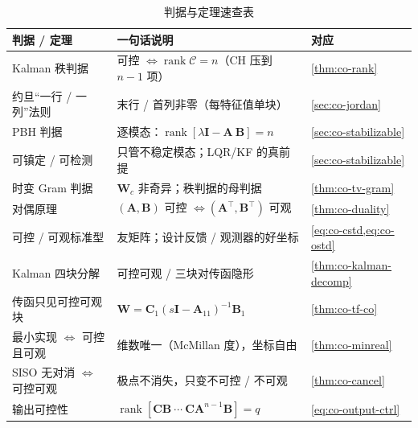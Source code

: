 \begin{table}[H]\centering\small
\caption{判据与定理速查表}
\begin{tabular}{lll}
\toprule
判据 / 定理 & 一句话说明 & 对应 \\
\midrule
Kalman 秩判据 & 可控 $\iff\operatorname{rank}\mathcal{C}=n$（CH 压到 $n-1$ 项） & \cref{thm:co-rank} \\
约旦“一行 / 一列”法则 & 末行 / 首列非零（每特征值单块） & \cref{sec:co-jordan} \\
PBH 判据 & 逐模态：$\operatorname{rank}[\lambda\mathbf{I}-\mathbf{A}\ \mathbf{B}]=n$ & \cref{sec:co-stabilizable} \\
可镇定 / 可检测 & 只管不稳定模态；LQR/KF 的真前提 & \cref{sec:co-stabilizable} \\
时变 Gram 判据 & $\mathbf{W}_c$ 非奇异；秩判据的母判据 & \cref{thm:co-tv-gram} \\
对偶原理 & $(\mathbf{A},\mathbf{B})$ 可控 $\iff(\mathbf{A}^\top,\mathbf{B}^\top)$ 可观 & \cref{thm:co-duality} \\
可控 / 可观标准型 & 友矩阵；设计反馈 / 观测器的好坐标 & \cref{eq:co-cstd,eq:co-ostd} \\
Kalman 四块分解 & 可控可观 / 三块对传函隐形 & \cref{thm:co-kalman-decomp} \\
传函只见可控可观块 & $\mathbf{W}=\mathbf{C}_1(s\mathbf{I}-\mathbf{A}_{11})^{-1}\mathbf{B}_1$ & \cref{thm:co-tf-co} \\
最小实现 $\iff$ 可控且可观 & 维数唯一（McMillan 度），坐标自由 & \cref{thm:co-minreal} \\
SISO 无对消 $\iff$ 可控可观 & 极点不消失，只变不可控 / 不可观 & \cref{thm:co-cancel} \\
输出可控性 & $\operatorname{rank}[\mathbf{C}\mathbf{B}\ \cdots\ \mathbf{C}\mathbf{A}^{n-1}\mathbf{B}]=q$ & \cref{eq:co-output-ctrl} \\
\bottomrule
\end{tabular}
\end{table}

